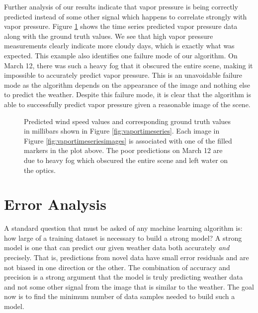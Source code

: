 Further analysis of our results indicate that vapor pressure is being correctly predicted instead of some other signal which happens to correlate strongly with vapor pressure. Figure \ref{fig:vaporpred} shows the time series predicted vapor pressure data along with the ground truth values. We see that high vapor pressure measurements clearly indicate more cloudy days, which is exactly what was expected. This example also identifies one failure mode of our algorithm. On March 12, there was such a heavy fog that it obscured the entire scene, making it impossible to accurately predict vapor pressure. This is an unavoidable failure mode as the algorithm depends on the appearance of the image and nothing else to predict the weather. Despite this failure mode, it is clear that the algorithm is able to successfully predict vapor pressure given a reasonable image of the scene.
\begin{figure}
	\centering
	\caption{Predicted wind speed values and corresponding ground truth values in millibars shown in Figure \ref{fig:vaportimeseries}. Each image in Figure \ref{fig:vaportimeseriesimages} is associated with one of the filled markers in the plot above. The poor predictions on March 12 are due to heavy fog which obscured the entire scene and left water on the optics.}
	\label{fig:vaporpred}
\end{figure}


\section{Error Analysis}
A standard question that must be asked of any machine learning algorithm is: how large of a training dataset is necessary to build a strong model? A strong model is one that can predict our given weather data both accurately \textit{and} precisely. That is, predictions from novel data have small error residuals and are not biased in one direction or the other. The combination of accuracy and precision is a strong argument that the model is truly predicting weather data and not some other signal from the image that is similar to the weather. The goal now is to find the minimum number of data samples needed to build such a model. 

